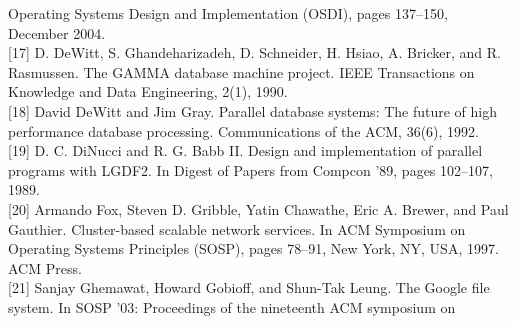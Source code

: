 \documentclass[
]{article}
\begin{document}
Operating Systems Design and Implementation (OSDI), pages 137--150,
December 2004.\\
{[}17{]} D. DeWitt, S. Ghandeharizadeh, D. Schneider, H. Hsiao, A.
Bricker, and R. Rasmussen. The GAMMA database machine project. IEEE
Transactions on Knowledge and Data Engineering, 2(1), 1990.\\
{[}18{]} David DeWitt and Jim Gray. Parallel database systems: The
future of high performance database processing. Communications of the
ACM, 36(6), 1992.\\
{[}19{]} D. C. DiNucci and R. G. Babb II. Design and implementation of
parallel programs with LGDF2. In Digest of Papers from Compcon '89,
pages 102--107, 1989.\\
{[}20{]} Armando Fox, Steven D. Gribble, Yatin Chawathe, Eric A. Brewer,
and Paul Gauthier. Cluster-based scalable network services. In ACM
Symposium on Operating Systems Principles (SOSP), pages 78--91, New
York, NY, USA, 1997. ACM Press.\\
{[}21{]} Sanjay Ghemawat, Howard Gobioff, and Shun-Tak Leung. The Google
file system. In SOSP '03: Proceedings of the nineteenth ACM symposium on
\end{document}
